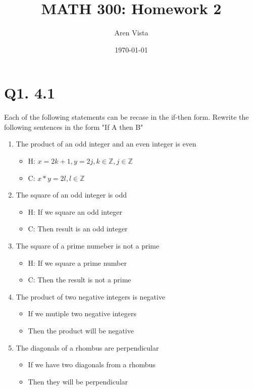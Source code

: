 \documentclass[11pt]{article}
\title{ MATH 300: Homework 2}
\author{ Aren Vista }
\date{\today}
\theoremstyle{plain}
\begin{document}
\maketitle	
\pagebreak

\section{Q1. 4.1}
Each of the following statements can be recase in the if-then form. Rewrite the following sentences in the form "If A then B"
\begin{enumerate}
    \item The product of an odd integer and an even integer is even
        \begin{itemize}
            \item H: $x=2k+1, y=2j, k \in \mathbb{Z}, j \in \mathbb{Z}$ 
            \item C: $x*y = 2l, l \in \mathbb{Z}$
        \end{itemize}
    \item The square of an odd integer is odd 
        \begin{itemize}
            \item H: If we square an odd integer 
            \item C: Then result is an odd integer
        \end{itemize}
    \item The square of a prime numeber is not a prime 
        \begin{itemize}
            \item H: If we square a prime number 
            \item C: Then the result is not a prime 
        \end{itemize}
    \item The product of two negative integers is negative  
        \begin{itemize}
            \item If we mutiple two negative integers 
            \item Then the product will be negative
        \end{itemize}
    \item The diagonals of a rhombus are perpendicular
        \begin{itemize}
            \item If we have two diagonals from a rhombus 
            \item Then they will be perpendicular
        \end{itemize}

\end{enumerate}
\end{document}
